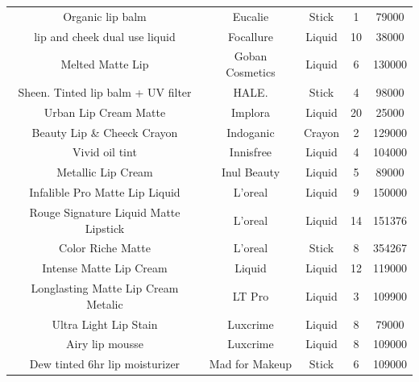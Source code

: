 \documentclass{article}
\begin{document}
\begin{longtable}{ccccc}
    Organic lip balm                        & Eucalie           & Stick                        & 1               & 79000          \\
    lip and cheek dual use liquid           & Focallure         & Liquid                       & 10              & 38000          \\
    Melted Matte Lip                        & Goban Cosmetics   & Liquid                       & 6               & 130000         \\
    Sheen. Tinted lip balm + UV filter      & HALE.             & Stick                        & 4               & 98000          \\
    Urban Lip Cream Matte                   & Implora           & Liquid                       & 20              & 25000          \\
    Beauty Lip \& Cheeck Crayon             & Indoganic         & Crayon                       & 2               & 129000         \\
    Vivid oil tint                          & Innisfree         & Liquid                       & 4               & 104000         \\
    Metallic Lip Cream                      & Inul Beauty       & Liquid                       & 5               & 89000          \\
    Infalible Pro Matte Lip Liquid          & L'oreal           & Liquid                       & 9               & 150000         \\
    Rouge Signature Liquid Matte Lipstick   & L'oreal           & Liquid                       & 14              & 151376         \\
    Color Riche Matte                       & L'oreal           & Stick                        & 8               & 354267         \\
    Intense Matte Lip Cream                 & Liquid            & Liquid                       & 12              & 119000         \\
    Longlasting Matte Lip Cream Metalic     & LT Pro            & Liquid                       & 3               & 109900         \\
    Ultra Light Lip Stain                   & Luxcrime          & Liquid                       & 8               & 79000          \\
    Airy lip mousse                         & Luxcrime          & Liquid                       & 8               & 109000         \\
    Dew tinted 6hr lip moisturizer          & Mad for Makeup    & Stick                        & 6               & 109000         \\

\end{longtable}
\end{document}

